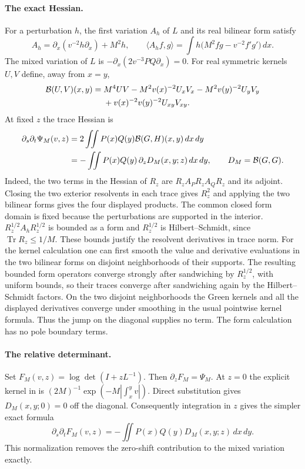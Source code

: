 \documentclass[11pt,letterpaper]{article}
\begin{document}
\paragraph{The exact Hessian.}
For a perturbation \(h\), the first variation \(A_h\) of \(L\) and
its real bilinear form satisfy
\[
 A_h=\partial_x(v^{-2}h\partial_x)+M^2h,\qquad
 \langle A_h f,g\rangle=
 \int h\big(M^2fg-v^{-2}f'g'\big)\,dx .
\]
The mixed variation of \(L\) is
\(-\partial_x(2v^{-3}PQ\partial_x)=0\).
For real symmetric kernels \(U,V\) define, away from \(x=y\),
\begin{align*}
 {\cal B}(U,V)(x,y)
  ={}&M^4 UV-M^2 v(x)^{-2}U_xV_x-M^2 v(y)^{-2}U_yV_y\\
     &+v(x)^{-2}v(y)^{-2}U_{xy}V_{xy}.
\end{align*}
At fixed \(z\) the trace Hessian is
\begin{align*}
 \partial_s\partial_t\Psi_M(v,z)
  &=2\iint P(x)Q(y){\cal B}(G,H)(x,y)\,dx\,dy\\
  &=-\iint P(x)Q(y)\,\partial_z D_M(x,y;z)\,dx\,dy,\qquad
 D_M={\cal B}(G,G).
\end{align*}
Indeed, the two terms in the Hessian of \(R_z\) are
\(R_z A_P R_z A_Q R_z\) and its adjoint. Closing the two exterior
resolvents in each trace gives \(R_z^2\) and applying the two bilinear
forms gives the four displayed products. The common closed form domain
is fixed because the perturbations are supported in the interior.
\(R_z^{1/2} A_h R_z^{1/2}\) is bounded as a form and \(R_z^{1/2}\) is
Hilbert--Schmidt, since \(\operatorname{Tr}R_z\leq1/M\).
These bounds justify the resolvent derivatives in trace norm. For the
kernel calculation one can first smooth the value and derivative
evaluations in the two bilinear forms on disjoint neighborhoods of
their supports. The resulting bounded form operators converge strongly
after sandwiching by \(R_z^{1/2}\), with uniform bounds, so their traces
converge after sandwiching again by the Hilbert--Schmidt factors.
On the two disjoint neighborhoods the Green kernels and all the
displayed derivatives converge under smoothing in the usual pointwise
kernel formula. Thus the jump on the diagonal supplies no term.
The form calculation has no pole boundary terms.

\paragraph{The relative determinant.}
Set \(F_M(v,z)=\log\det(I+zL^{-1})\). Then \(\partial_zF_M=\Psi_M\).
At \(z=0\) the explicit kernel in \cite[Lemma~9.1]{original} is
\((2M)^{-1}\exp(-M|\int_x^y v|)\). Direct substitution gives
\(D_M(x,y;0)=0\) off the diagonal. Consequently integration in \(z\)
gives the simpler exact formula
\[
 \partial_s\partial_t F_M(v,z)
    =-\iint P(x)Q(y)D_M(x,y;z)\,dx\,dy .
\]
This normalization removes the zero-shift contribution to the mixed
variation exactly.
\end{document}
